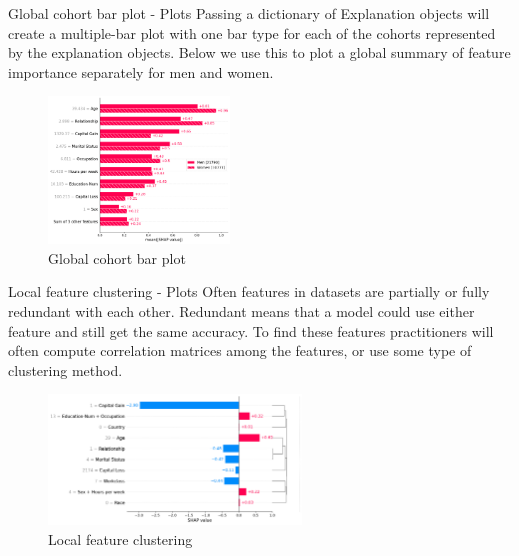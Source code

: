 \documentclass[aspectratio=169]{beamer}
\begin{document}
\begin{frame}{Global cohort bar plot - Plots}
Passing a dictionary of Explanation objects will create a multiple-bar plot with one bar type for each of the cohorts represented by the explanation objects. Below we use this to plot a global summary of feature importance separately for men and women.
    \begin{figure}[htbp]
        \centering
        \includegraphics[width=0.43\textwidth]{figs/shap/plots/bar/example_notebooks_api_examples_plots_bar_9_0.png}
        \caption{Global cohort bar plot}
        \label{fig:Cohort-bar}
    \end{figure}
\end{frame}

\begin{frame}{Local feature clustering - Plots}
Often features in datasets are partially or fully redundant with each other. Redundant means that a model could use either feature and still get the same accuracy. To find these features practitioners will often compute correlation matrices among the features, or use some type of clustering method. 
    \begin{figure}[htbp]
        \centering
        \includegraphics[width=0.6\textwidth]{figs/shap/plots/bar/example_notebooks_api_examples_plots_bar_20_0.png}
        \caption{Local feature clustering}
        \label{fig:local-feature-bar}
    \end{figure}
\end{frame}
\end{document}

